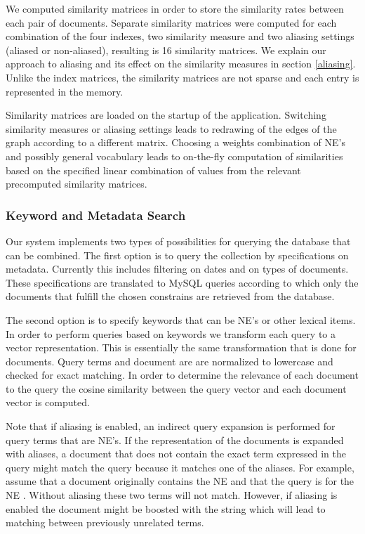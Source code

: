 We computed similarity matrices in order to store the similarity rates between each pair of documents. Separate similarity matrices were computed for each combination of the four indexes, two similarity measure and two aliasing settings (aliased or non-aliased), resulting is 16 similarity matrices. We explain our approach to aliasing and its effect on the similarity measures in section \ref{aliasing}. Unlike the index matrices, the similarity matrices are not sparse and each entry is represented in the memory.

Similarity matrices are loaded on the startup of the application. Switching similarity measures or aliasing settings leads to redrawing of the edges of the graph according to a different matrix. Choosing a weights combination of NE's and possibly general vocabulary leads to on-the-fly computation of similarities based on the specified linear combination of values from the relevant precomputed similarity matrices.

   
\subsubsection{Keyword and Metadata Search}\label{sec:keyword_search}

Our system implements two types of possibilities for querying the database that can be combined. The first option is to query the collection by specifications on metadata. Currently this includes filtering on dates and on types of documents. These specifications are translated to MySQL queries according to which only the documents that fulfill the chosen constrains are retrieved from the database. 

The second option is to specify keywords that can be NE's or other lexical items. In order to perform queries based on keywords we transform each query to a vector representation. This is essentially the same transformation that is done for documents. Query terms and document are are normalized to lowercase and checked for exact matching. In order to determine the relevance of each document to the query the cosine similarity between the query vector and each document vector is computed. 

Note that if aliasing is enabled, an indirect query expansion is performed for query terms that are NE's. If the representation of the documents is expanded with aliases, a document that does not contain the exact term expressed in the query might match the query because it matches one of the aliases. For example, assume that a document originally contains the NE  and that the query is for the NE . Without aliasing these two terms will not match. However, if aliasing is enabled the document might be boosted with the string  which will lead to matching between previously unrelated terms. 

